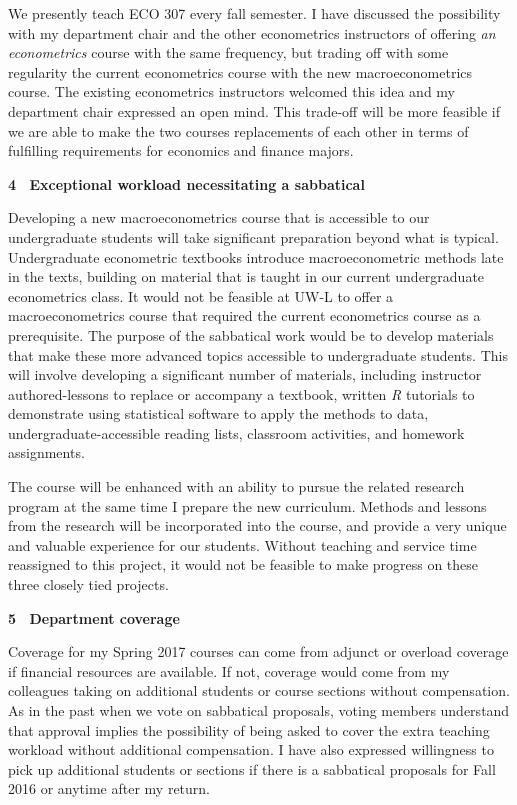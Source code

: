 \documentclass[11pt]{article}
\begin{document}
We presently teach ECO 307 every fall semester.  I have discussed the possibility with my department chair and the other econometrics instructors of offering \textit{an econometrics} course with the same frequency, but trading off with some regularity the current econometrics course with the new macroeconometrics course.  The existing econometrics instructors welcomed this idea and my department chair expressed an open mind.  This trade-off will be more feasible if we are able to make the two courses replacements of each other in terms of fulfilling requirements for economics and finance majors.

\textbf{4~ Exceptional workload necessitating a sabbatical}

Developing a new macroeconometrics course that is accessible to our undergraduate students will take significant preparation beyond what is typical.  Undergraduate econometric textbooks introduce macroeconometric methods late in the texts, building on material that is taught in our current undergraduate econometrics class.  It would not be feasible at UW-L to offer a macroeconometrics course that required the current econometrics course as a prerequisite.  The purpose of the sabbatical work would be to develop materials that make these more advanced topics accessible to undergraduate students.  This will involve developing a significant number of materials, including instructor authored-lessons to replace or accompany a textbook, written \textit{R} tutorials to demonstrate using statistical software to apply the methods to data, undergraduate-accessible reading lists, classroom activities, and homework assignments.

The course will be enhanced with an ability to pursue the related research program at the same time I prepare the new curriculum.  Methods and lessons from the research will be incorporated into the course, and provide a very unique and valuable experience for our students.  Without teaching and service time reassigned to this project, it would not be feasible to make progress on these three closely tied projects.

\textbf{5~ Department coverage}

Coverage for my Spring 2017 courses can come from adjunct or overload coverage if financial resources are available.  If not, coverage would come from my colleagues taking on additional students or course sections without compensation.  As in the past when we vote on sabbatical proposals, voting members understand that approval implies the possibility of being asked to cover the extra teaching workload without additional compensation.  I have also expressed willingness to pick up additional students or sections if there is a sabbatical proposals for Fall 2016 or anytime after my return.
\end{document}
